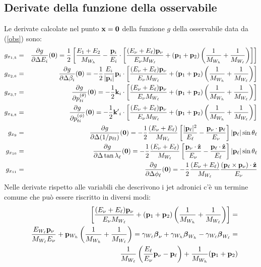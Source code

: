 \subsection{Derivate della funzione della osservabile}
%
Le derivate calcolate nel punto ${\bf x}={\bf 0}$ della funzione $g$ della osservabile
data da (\ref{obs}) sono:
\begin{eqnarray}
g_{x_{1,5}}&=&\frac{\partial g}{\partial\Delta E_i}({\bf 0})=\frac{1}{2}\left[\frac{E_1+E_2}{M_{W_h}}-\frac{{\bf p}_i}{E_i}\cdot\left[\frac{(E_\nu+E_\ell){\bf p}_\nu}{E_\nu M_{W_\ell}}+({\bf p}_1+{\bf p}_2)\left(\frac{1}{M_{W_h}}+\frac{1}{M_{W_\ell}}\right)\right]\right]\\
g_{x_{2,6}}&=&\frac{\partial g}{\partial\Delta\beta_i}({\bf 0})=-\frac{1}{2}\frac{E_i}{|{\bf p}_i|}{\bf p}_i\cdot\left[\frac{(E_\nu+E_\ell){\bf p}_\nu}{E_\nu M_{W_\ell}}+({\bf p}_1+{\bf p}_2)\left(\frac{1}{M_{W_h}}+\frac{1}{M_{W_\ell}}\right)\right]\\
g_{x_{3,7}}&=&\frac{\partial g}{\partial{p^{(\theta)}_{ti}}}({\bf 0})=-\frac{1}{2}{\bf k}_i\cdot\left[\frac{(E_\nu+E_\ell){\bf p}_\nu}{E_\nu M_{W_\ell}}+({\bf p}_1+{\bf p}_2)\left(\frac{1}{M_{W_h}}+\frac{1}{M_{W_\ell}}\right)\right]\\
g_{x_{4,8}}&=&\frac{\partial g}{\partial{p^{(\phi)}_{ti}}}({\bf 0})=-\frac{1}{2}{\bf k^\prime}_i\cdot\left[\frac{(E_\nu+E_\ell){\bf p}_\nu}{E_\nu M_{W_\ell}}+({\bf p}_1+{\bf p}_2)\left(\frac{1}{M_{W_h}}+\frac{1}{M_{W_\ell}}\right)\right]\\
g_{x_9}&=&\frac{\partial g}{\partial\Delta(1/p_{\ell t})}({\bf 0})=-\frac{1}{2}\frac{(E_\nu+E_\ell)}{M_{W_\ell}}\left[\frac{|{\bf p}_\ell|^2}{E_\ell}-\frac{{\bf p}_\nu\cdot{\bf p}_\ell}{E_\nu}\right]|{\bf p}_\ell|\sin\theta_\ell\\
g_{x_{10}}&=&\frac{\partial g}{\partial\Delta\tan\lambda_\ell}({\bf 0})=-\frac{1}{2}\frac{(E_\nu+E_\ell)}{M_{W_\ell}}\left[\frac{{\bf p}_\nu\cdot\hat{\bf z}}{E_\nu}-\frac{{\bf p}_\ell\cdot\hat{\bf z}}{E_\ell}\right]|{\bf p}_\ell|\sin\theta_\ell\\
g_{x_{11}}&=&\frac{\partial g}{\partial\Delta\phi_\ell}({\bf 0})=-\frac{1}{2}\frac{(E_\nu+E_\ell)}{M_{W_\ell}}\frac{({\bf p}_\ell\times{\bf p}_\nu)\cdot\hat{\bf z}}{E_\nu}
\end{eqnarray}
Nelle derivate rispetto alle variabili che descrivono i jet adronici c'\`e un termine
comune che pu\`o essere riscritto in diversi modi:
\begin{eqnarray*}
&&\left[\frac{(E_\nu+E_\ell){\bf p}_\nu}{E_\nu M_{W_\ell}}+({\bf p}_1+{\bf p}_2)\left(\frac{1}{M_{W_h}}+\frac{1}{M_{W_\ell}}\right)\right]=\\
&&\frac{E_{W_\ell}{\bf p}_\nu}{M_{W_\ell} E_\nu}+{\bf p}_{W_h}\left(\frac{1}{M_{W_h}}+\frac{1}{M_{W_\ell}}\right)=\gamma_{W_\ell}\mbox{\boldmath $\beta$}_\nu+\gamma_{W_h}\mbox{\boldmath $\beta$}_{W_h}-\gamma_{W_\ell}\mbox{\boldmath $\beta$}_{W_\ell}=\\
&&\frac{1}{M_{W_\ell}}\left(\frac{E_\ell}{E_\nu}{\bf p}_\nu-{\bf p}_\ell\right)+\frac{1}{M_{W_h}}({\bf p}_1+{\bf p}_2)
\end{eqnarray*}
